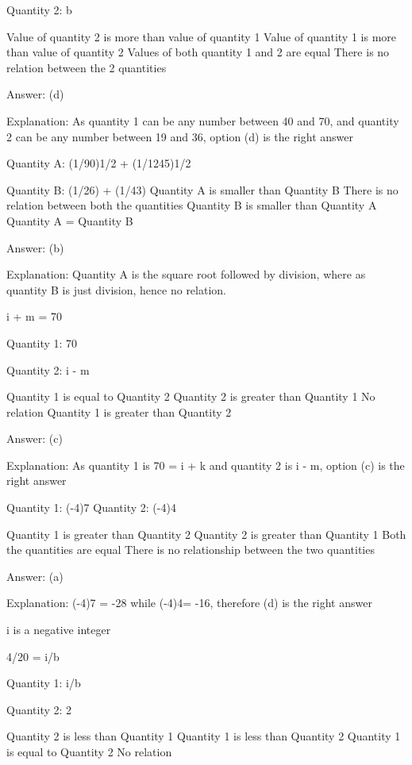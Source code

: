     Quantity 2: b

        Value of quantity 2 is more than value of quantity 1
        Value of quantity 1 is more than value of quantity 2
        Values of both quantity 1 and 2 are equal
        There is no relation between the 2 quantities

    Answer: (d)

    Explanation: As quantity 1 can be any number between 40 and 70, and quantity 2 can be any number between 19 and 36, option (d) is the right answer

    Quantity A: (1/90)1/2 + (1/1245)1/2

    Quantity B: (1/26) + (1/43)
        Quantity A is smaller than Quantity B
        There is no relation between both the quantities
        Quantity B is smaller than Quantity A
        Quantity A = Quantity B

    Answer: (b)

    Explanation: Quantity A is the square root followed by division, where as quantity B is just division, hence no relation.

    i + m = 70

    Quantity 1: 70

    Quantity 2: i - m

        Quantity 1 is equal to Quantity 2
        Quantity 2 is greater than Quantity 1
        No relation
        Quantity 1 is greater than Quantity 2

    Answer: (c)

    Explanation: As quantity 1 is 70 = i + k and quantity 2 is i - m, option (c) is the right answer

    Quantity 1: (-4)7 Quantity 2: (-4)4

        Quantity 1 is greater than Quantity 2
        Quantity 2 is greater than Quantity 1
        Both the quantities are equal
        There is no relationship between the two quantities

    Answer: (a)

    Explanation: (-4)7 = -28 while (-4)4= -16, therefore (d) is the right answer

    i is a negative integer

    4/20 = i/b

    Quantity 1: i/b

    Quantity 2: 2

        Quantity 2 is less than Quantity 1
        Quantity 1 is less than Quantity 2
        Quantity 1 is equal to Quantity 2
        No relation

